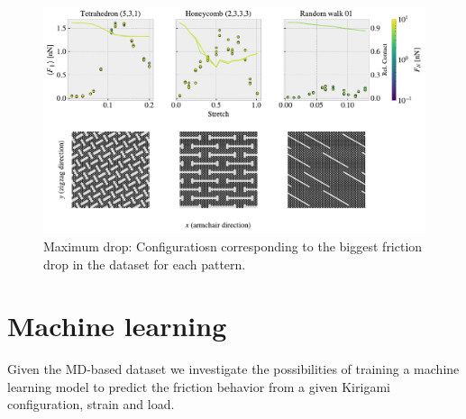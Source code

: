 \begin{figure}[H]
  \centering
  \includegraphics[width=\linewidth]{figures/stretch_profiles/PP_max_drop.pdf}
  \caption{Maximum drop: Configuratiosn corresponding to the biggest friction drop in the dataset for each pattern.}
  \label{fig:PP_max_drop}
\end{figure}  









\section{Machine learning}\label{eq:ML}
Given the \acrshort{MD}-based dataset we investigate the possibilities of training a machine learning model to predict the friction behavior from a given Kirigami configuration, strain and load. 


